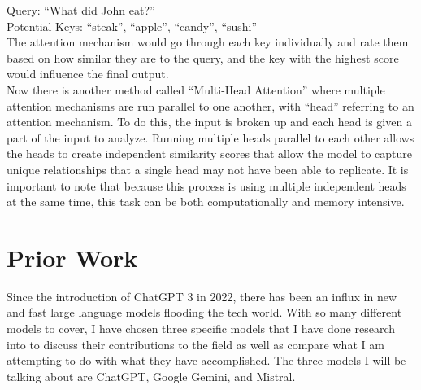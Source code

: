 \documentclass[10pt,twocolumn]{article}
\begin{document}
    
\indent Query: “What did John eat?”\\
\indent Potential Keys: “steak”, “apple”, “candy”, “sushi”\\
\indent The attention mechanism would go through each key  
\indent individually and rate them based on how similar they 
\indent are to the query, and the key with the highest score would 
\indent influence the final output.
\\



Now there is another method called “Multi-Head Attention” where multiple attention mechanisms are run parallel to one another, with “head” referring to an attention mechanism\cite{noauthor_papers_nodate}. To do this, the input is broken up and each head is given a part of the input to analyze. Running multiple heads parallel to each other allows the heads to create independent similarity scores that allow the model to capture unique relationships that a single head may not have been able to replicate. It is important to note that because this process is using multiple independent heads at the same time, this task can be both computationally and memory intensive.


\section{Prior Work}
Since the introduction of ChatGPT 3 in 2022, there has been an influx in new and fast large language models flooding the tech world. With so many different models to cover, I have chosen three specific models that I have done research into to discuss their contributions to the field as well as compare what I am attempting to do with what they have accomplished. The three models I will be talking about are ChatGPT, Google Gemini, and Mistral. 
\end{document}
